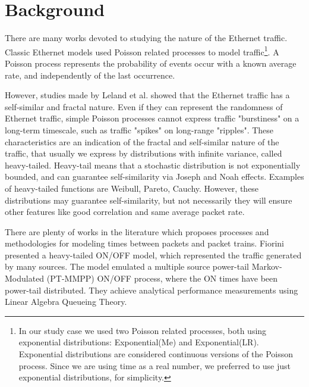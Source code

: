 \section{Background}


There are many works devoted to studying the nature of the Ethernet traffic\cite{selfsimilar-ethernet}. Classic Ethernet models used Poisson related processes to model traffic\footnote{In our study case we used two Poisson related processes, both using exponential distributions: Exponential(Me) and Exponential(LR). Exponential distributions are considered continuous versions of the Poisson process.  Since we are using time as a real number, we preferred to use just exponential distributions, for simplicity.}. A Poisson process represents the probability of events occur with a known average rate, and independently of the last occurrence\cite{book-poisson}. 

However, studies made by Leland et al.  showed that the Ethernet traffic has a self-similar and fractal nature. Even if they can represent the randomness of   Ethernet traffic, simple Poisson processes cannot express traffic "burstiness" on a long-term timescale, such as traffic "spikes" on long-range "ripples". These characteristics are an indication of the fractal and self-similar nature of the traffic, that usually we express by distributions with infinite variance, called heavy-tailed. Heavy-tail means that a stochastic distribution is not exponentially bounded\cite{sourcesonoff-paper}, and can guarantee self-similarity via Joseph and Noah effects\cite{selfsimilar-highvariability}. Examples of heavy-tailed functions are Weibull, Pareto, Cauchy. However, these distributions may guarantee self-similarity, but not necessarily they will ensure other features like good correlation and same average packet rate\cite{validate-trafficgen}. 

There are plenty of works in the literature which proposes processes and methodologies for modeling times between packets and packet trains\cite{selfsimilar-ethernet}\cite{analysis-self-similar}\cite{stochastic-selfsimilar}\cite{selfsimilar-highvariability}\cite{multi-player-online-game-self-similarity}\cite{estimation-renewal-function-ethernet-traffic}\cite{modelling-of-self-similar}\cite{empirical-interarrival-study}\cite{modeling-concurrent-heavy-tailed}\cite{optimal-scheduling-of-heavy-tailed-traffic}\cite{modelling-of-self-similar}. Fiorini\cite{modeling-concurrent-heavy-tailed}  presented a heavy-tailed ON/OFF model, which represented the traffic generated by many sources. The model emulated a multiple source power-tail Markov-Modulated (\acrshort{PT-MMPP}) ON/OFF process, where the ON times have been power-tail distributed. They achieve analytical performance measurements using Linear Algebra Queueing Theory. 

